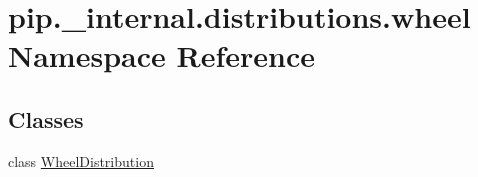 \hypertarget{namespacepip_1_1__internal_1_1distributions_1_1wheel}{}\section{pip.\+\_\+internal.\+distributions.\+wheel Namespace Reference}
\label{namespacepip_1_1__internal_1_1distributions_1_1wheel}
\subsection*{Classes}
\begin{DoxyCompactItemize}
\item 
class \hyperlink{classpip_1_1__internal_1_1distributions_1_1wheel_1_1WheelDistribution}{Wheel\+Distribution}
\end{DoxyCompactItemize}

